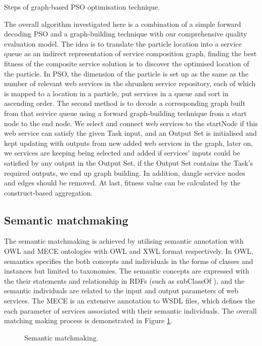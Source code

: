 \documentclass{llncs}
\begin{document}
\begin{algorithm}[!htb]
 \caption{Steps of graph-based PSO optimisation technique.}
\label{psoSteps}
\end{algorithm}
The overall algorithm investigated here is a combination of a simple forward decoding PSO \cite{da2016particle} and a graph-building technique \cite{blum1997fast} with our comprehensive quality evaluation model. The idea is to translate the particle location into a service queue as an indirect representation of service composition graph, finding the best fitness of the composite service solution is to discover the optimised location of the particle. In PSO, the dimension of the particle is set up as the same as the number of relevant web services in the shrunken service repository, each of which is mapped to a location in a particle, put services in a queue and sort in ascending order. The second method is to decode a corresponding graph built from that service queue using a forward graph-building technique from a start node to the end node. We select and connect web services to the startNode if this web service can satisfy the given Task input, and an Output Set is initialised and kept updating with outputs from new added web services in the graph, later on, we services are keeping being selected and added if services' inputs could be satisfied by any output in the Output Set, if the Output Set contains the Task's required outputs, we end up graph building. In addition, dangle service nodes and edges should be removed. At last, fitness value can be calculated by the construct-based aggregation.

\subsection{Semantic matchmaking}
The semantic matchmaking is achieved by utilising semantic annotation with OWL and MECE ontologies \cite{bleul2008self} with OWL and XWL format respectively. In OWL, semantics specifies the both concepts and individuals in the forms of classes and instances but limited to taxonomies. The semantic concepts are expressed with the their statements and relationship in RDFs (such as subClassOf ), and the semantic individuals are related to the input and output parameters of web services. The MECE is an extensive annotation to WSDL files, which defines the each parameter of services associated with their semantic individuals. The overall matching making process is demonstrated in Figure \ref{matchmaking}.

\begin{figure}[h]
\centerline{
}
 \caption{Semantic matchmaking.}
 \label{matchmaking}
\end{figure}
\end{document}
